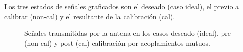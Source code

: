 Los tres estados de señales graficados son el deseado (caso ideal), el previo a calibrar (non-cal) y el resultante de la
calibración (cal).
\begin{figure}[H]
	\centering

	\caption{Señales transmitidas por la antena en los casos deseado (ideal), pre (non-cal) y post (cal) calibración por acoplamientos mutuos.}
	\label{fig:chirpErrMutual10degCol}
\end{figure}

